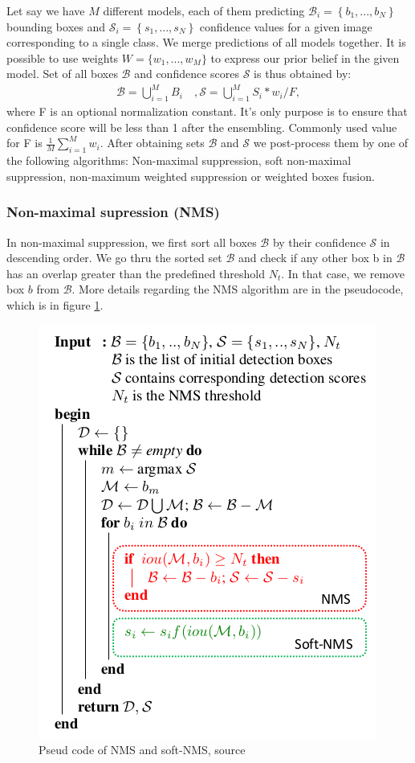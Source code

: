 Let say we have $M$ different models, each of them predicting $\mathcal{B}_i = \left\{b_1,...,b_N \right\} $ bounding boxes and $\mathcal{S}_i = \left\{ s_1,...,s_N \right\} $ confidence values for a given image corresponding to a single class. We merge predictions of all models together. It is possible to use weights $\mathit{W} = \{w_1,...,w_M \}$ to express our prior belief in the given model. Set of all boxes $\mathcal{B}$ and confidence scores $\mathcal{S}$ is thus obtained by:
\begin{align}
    \mathcal{B} = \bigcup_{i=1}^{M} B_i \quad, \mathcal{S} = \bigcup_{i=1}^{M} S_i * w_i / F,
\end{align}
where F is an optional normalization constant. It's only purpose is to ensure that confidence score will be less than 1 after the ensembling. Commonly used value for F is $\frac{1}{M} \sum_{i=1}^M w_i$. After obtaining sets $\mathcal{B}$ and $\mathcal{S}$ we post-process them by one of the following algorithms: Non-maximal suppression, soft non-maximal suppression, non-maximum weighted suppression or weighted boxes fusion.

\subsubsection{Non-maximal supression (NMS)}
In non-maximal suppression, we first sort all boxes $\mathcal{B}$ by their confidence $\mathcal{S}$ in descending order. We go thru the sorted set $\mathcal{B}$ and check if any other box b in $\mathcal{B}$ has an overlap greater than the predefined threshold $N_t$.  In that case, we remove box $b$ from $\mathcal{B}$. More details regarding the NMS algorithm are in the pseudocode, which is in figure \ref{alg:nms}.
\begin{figure}
    \centering
    \includegraphics{images/nms_algo.png}
    \caption{Pseud code of NMS and soft-NMS, source \cite{Bodla2017}}
    \label{alg:nms}
\end{figure}

